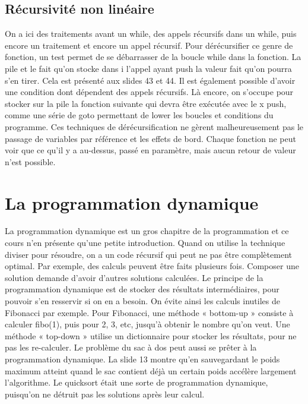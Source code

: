 \documentclass[10pt]{article}
\begin{document}
\subsection{Récursivité non linéaire}
On a ici des traitements avant un while, des appels récursifs dans un while, puis encore un traitement et encore un appel récursif.  
\newline \newline 
Pour dérécursifier ce genre de fonction, un test permet de se débarrasser de la boucle while dans la fonction. La pile et le fait qu'on stocke dans i l'appel ayant push la valeur fait qu'on pourra s'en tirer. Cela est présenté aux slides 43 et 44. 
\newline \newline 
Il est également possible d'avoir une condition dont dépendent des appels récursifs. Là encore, on s'occupe pour stocker sur la pile la fonction suivante qui devra être exécutée avec le x push, comme une série de goto permettant de lower les boucles et conditions du programme.  
\newline \newline 
Ces techniques de dérécursification ne gèrent malheureusement pas le passage de variables par référence et les effets de bord. Chaque fonction ne peut voir que ce qu'il y a au-dessus, passé en paramètre, mais aucun retour de valeur n'est possible. 
\newpage
\section{La programmation dynamique}
La programmation dynamique est un gros chapitre de la programmation et ce cours n'en présente qu'une petite introduction. Quand on utilise la technique diviser pour résoudre, on a un code récursif qui peut ne pas être complètement optimal. Par exemple, des calculs peuvent être faits plusieurs fois. Composer une solution demande d'avoir d'autres solutions calculées.  
\newline \newline 
Le principe de la programmation dynamique est de stocker des résultats intermédiaires, pour pouvoir s'en resservir si on en a besoin. On évite ainsi les calculs inutiles de Fibonacci par exemple. 
\newline \newline 
Pour Fibonacci, une méthode « bottom-up » consiste à calculer fibo(1), puis pour 2, 3, etc, jusqu'à obtenir le nombre qu'on veut. Une méthode « top-down » utilise un dictionnaire pour stocker les résultats, pour ne pas les re-calculer. 
\newline \newline 
Le problème du sac à dos peut aussi se prêter à la programmation dynamique. La slide 13 montre qu'en sauvegardant le poids maximum atteint quand le sac contient déjà un certain poids accélère largement l'algorithme.  
\newline \newline 
Le quicksort était une sorte de programmation dynamique, puisqu'on ne détruit pas les solutions après leur calcul. 
\newpage
\end{document}
